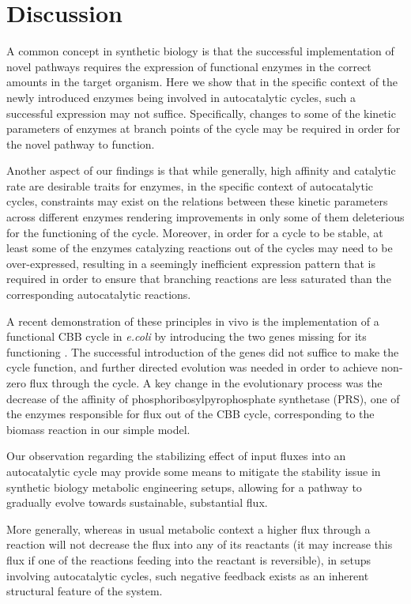 \documentclass[a4page,notitlepage]{article}
\begin{document}
\section{Discussion}
A common concept in synthetic biology is that the successful implementation of novel pathways requires the expression of functional enzymes in the correct amounts in the target organism.
Here we show that in the specific context of the newly introduced enzymes being involved in autocatalytic cycles, such a successful expression may not suffice.
Specifically, changes to some of the kinetic parameters of enzymes at branch points of the cycle may be required in order for the novel pathway to function.

Another aspect of our findings is that while generally, high affinity and catalytic rate are desirable traits for enzymes, in the specific context of autocatalytic cycles, constraints may exist on the relations between these kinetic parameters across different enzymes rendering improvements in only some of them deleterious for the functioning of the cycle.
Moreover, in order for a cycle to be stable, at least some of the enzymes catalyzing reactions out of the cycles may need to be over-expressed, resulting in a seemingly inefficient expression pattern that is required in order to ensure that branching reactions are less saturated than the corresponding autocatalytic reactions.

A recent demonstration of these principles in vivo is the implementation of a functional CBB cycle in \emph{e.coli} by introducing the two genes missing for its functioning \cite{Antonovski2016}.
The successful introduction of the genes did not suffice to make the cycle function, and further directed evolution was needed in order to achieve non-zero flux through the cycle.
A key change in the evolutionary process was the decrease of the affinity of phosphoribosylpyrophosphate synthetase (PRS), one of the enzymes responsible for flux out of the CBB cycle, corresponding to the biomass reaction in our simple model.

Our observation regarding the stabilizing effect of input fluxes into an autocatalytic cycle may provide some means to mitigate the stability issue in synthetic biology metabolic engineering setups, allowing for a pathway to gradually evolve towards sustainable, substantial flux.

More generally, whereas in usual metabolic context a higher flux through a reaction will not decrease the flux into any of its reactants (it may increase this flux if one of the reactions feeding into the reactant is reversible), in setups involving autocatalytic cycles, such negative feedback exists as an inherent structural feature of the system.
\end{document}
